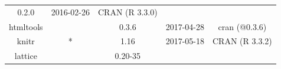 \documentclass[]{article}
\begin{document}
\begin{itemize}
\begin{longtable}[]{@{}ccccc@{}}
\begin{minipage}[t]{0.13\columnwidth}
  0.2.0\strut
  \end{minipage} & \begin{minipage}[t]{0.13\columnwidth}\centering\strut
  2016-02-26\strut
  \end{minipage} & \begin{minipage}[t]{0.29\columnwidth}\centering\strut
  CRAN (R 3.3.0)\strut
  \end{minipage}\tabularnewline
  \begin{minipage}[t]{0.13\columnwidth}\centering\strut
  htmltools\strut
  \end{minipage} & \begin{minipage}[t]{0.05\columnwidth}\centering\strut
  \strut
  \end{minipage} & \begin{minipage}[t]{0.13\columnwidth}\centering\strut
  0.3.6\strut
  \end{minipage} & \begin{minipage}[t]{0.13\columnwidth}\centering\strut
  2017-04-28\strut
  \end{minipage} & \begin{minipage}[t]{0.29\columnwidth}\centering\strut
  cran (@0.3.6)\strut
  \end{minipage}\tabularnewline
  \begin{minipage}[t]{0.13\columnwidth}\centering\strut
  knitr\strut
  \end{minipage} & \begin{minipage}[t]{0.05\columnwidth}\centering\strut
  *\strut
  \end{minipage} & \begin{minipage}[t]{0.13\columnwidth}\centering\strut
  1.16\strut
  \end{minipage} & \begin{minipage}[t]{0.13\columnwidth}\centering\strut
  2017-05-18\strut
  \end{minipage} & \begin{minipage}[t]{0.29\columnwidth}\centering\strut
  CRAN (R 3.3.2)\strut
  \end{minipage}\tabularnewline
  \begin{minipage}[t]{0.13\columnwidth}\centering\strut
  lattice\strut
  \end{minipage} & \begin{minipage}[t]{0.05\columnwidth}\centering\strut
  \strut
  \end{minipage} & \begin{minipage}[t]{0.13\columnwidth}\centering\strut
  0.20-35\strut
  \end{minipage} & \begin{minipage}[t]{0.13\columnwidth}\centering\strut

\end{minipage}
\end{longtable}
\end{itemize}
\end{document}
